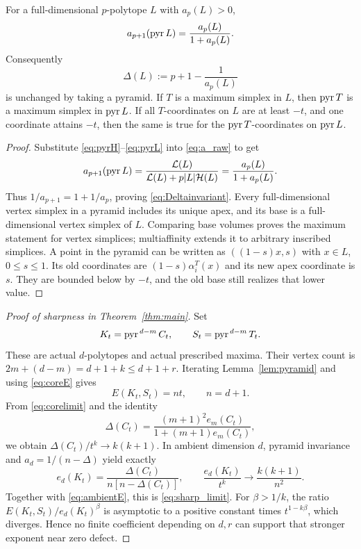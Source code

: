 \begin{lemma}\label{lem:pyramid}
For a full-dimensional $p$-polytope $L$ with $a_p(L)>0$,
\begin{equation}\label{eq:apyr}
 a_{p+1}(\operatorname{pyr} L)=\frac{a_p(L)}{1+a_p(L)}.
\end{equation}
Consequently
\begin{equation}\label{eq:Deltainvariant}
 \Delta(L):=p+1-\frac1{a_p(L)}
\end{equation}
is unchanged by taking a pyramid. If $T$ is a maximum simplex in $L$,
then $\operatorname{pyr} T$ is a maximum simplex in $\operatorname{pyr} L$. If all $T$-coordinates
on $L$ are at least $-t$, and one coordinate attains $-t$, then the
same is true for the $\operatorname{pyr} T$-coordinates on $\operatorname{pyr} L$.
\end{lemma}
\begin{proof}
Substitute \eqref{eq:pyrH}--\eqref{eq:pyrL} into \eqref{eq:a_raw} to get
\[
 a_{p+1}(\operatorname{pyr} L)
 =\frac{\mathcal L(L)}{\mathcal L(L)+p|L|\mathcal H(L)}
 =\frac{a_p(L)}{1+a_p(L)}.
\]
Thus $1/a_{p+1}=1+1/a_p$, proving \eqref{eq:Deltainvariant}.
Every full-dimensional vertex simplex in a pyramid includes its unique
apex, and its base is a full-dimensional vertex simplex of $L$. Comparing
base volumes proves the maximum statement for vertex simplices;
multiaffinity extends it to arbitrary inscribed simplices. A point in the
pyramid can be written as $((1-s)x,s)$ with $x\in L$, $0\le s\le1$.
Its old coordinates are $(1-s)\alpha_i^T(x)$ and its new apex coordinate
is $s$. They are bounded below by $-t$, and the old base still realizes
that lower value.
\end{proof}

\begin{proof}[Proof of sharpness in Theorem~\ref{thm:main}]
Set
\[
 K_t=\operatorname{pyr}^{\,d-m}C_t,\qquad S_t=\operatorname{pyr}^{\,d-m}T_t.
\]
These are actual $d$-polytopes and actual prescribed maxima. Their vertex
count is $2m+(d-m)=d+1+k\le d+1+r$. Iterating
Lemma~\ref{lem:pyramid} and using \eqref{eq:coreE} gives
\begin{equation}\label{eq:ambientE}
 E(K_t,S_t)=nt,\qquad n=d+1.
\end{equation}
From \eqref{eq:corelimit} and the identity
\[
 \Delta(C_t)=\frac{(m+1)^2e_m(C_t)}{1+(m+1)e_m(C_t)},
\]
we obtain $\Delta(C_t)/t^k\to k(k+1)$. In ambient dimension $d$, pyramid
invariance and $a_d=1/(n-\Delta)$ yield exactly
\begin{equation}\label{eq:ambiente}
 e_d(K_t)=\frac{\Delta(C_t)}{n[n-\Delta(C_t)]},\qquad
 \frac{e_d(K_t)}{t^k}\longrightarrow\frac{k(k+1)}{n^2}.
\end{equation}
Together with \eqref{eq:ambientE}, this is \eqref{eq:sharp_limit}.
For $\beta>1/k$, the ratio $E(K_t,S_t)/e_d(K_t)^\beta$ is asymptotic to a
positive constant times $t^{1-k\beta}$, which diverges. Hence no finite
coefficient depending on $d,r$ can support that stronger exponent near
zero defect.
\end{proof}
